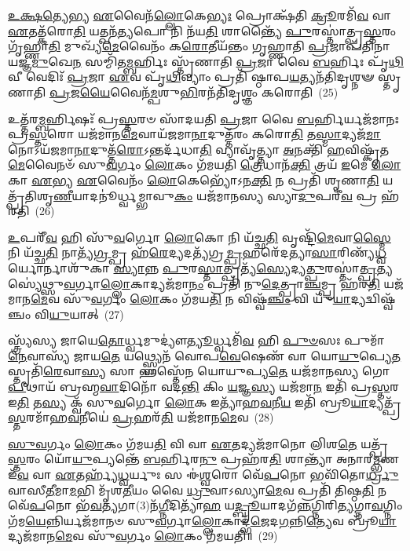 \-\ul{𑌉}\-\-\ul{𑌕𑍍𑌷}\-\-\ul{𑌤𑍍𑌯𑍇}\-𑌭𑍍𑌯 \ul{𑌏}\-𑌵𑍈𑌨᳴\-\ul{𑌲𑍍𑌲𑍋}\-𑌕𑍇\-\ul{𑌭𑍍𑌯𑌃} 𑌪𑍍𑌰𑍋𑌕𑍍𑌷᳴𑌤𑌿 \ul{𑌕𑍍𑌰𑍂}\-𑌰𑌮𑌿᳴\-\ul{𑌵} 𑌵𑌾 \ul{𑌏}\-𑌤𑌤𑍍𑌕᳴𑌰𑍋\-\ul{𑌤𑌿} 𑌯𑌤𑍍𑌖𑌨᳴\-\ul{𑌤𑍍𑌯}\-𑌪𑍋 𑌨𑌿 𑌨᳴𑌯\-\ul{𑌤𑌿} 𑌶𑌾𑌨𑍍𑌤𑍍𑌯𑍈᳴ \ul{𑌪𑍁}\-𑌰𑌸𑍍𑌤𑌾॑𑌤𑍍𑌪𑍍𑌰\-\ul{𑌸𑍍𑌤}\-𑌰𑌂 𑌗𑍃᳴𑌹𑍍𑌣𑌾\-\ul{𑌤𑌿} 𑌮𑍁𑌖𑍍𑌯᳴\-\ul{𑌮𑍇}\-𑌵𑍈𑌨𑌂᳴ 𑌕\-\ul{𑌰𑍋}\-𑌤𑍀𑌯᳴𑌨𑍍𑌤𑌂 𑌗𑍃𑌹𑍍𑌣𑌾𑌤𑌿 \ul{𑌪𑍍𑌰}\-𑌜𑌾𑌪᳴𑌤𑌿𑌨𑌾 𑌯𑌜𑍍𑌞\-\ul{𑌮𑍁}\-𑌖𑍇\-\ul{𑌨} 𑌸𑌮𑍍𑌮𑌿᳴𑌤\-\ul{𑌮𑍍𑌬}\-𑌰𑍍\mbox{}𑌹𑌿𑌃 𑌸𑍍𑌤𑍃᳴𑌣𑌾𑌤𑌿 \ul{𑌪𑍍𑌰}\-𑌜𑌾 𑌵𑍈 \ul{𑌬}\-𑌰𑍍\mbox{}𑌹𑌿𑌃 𑌪𑍃᳴\-\ul{𑌥𑌿}\-𑌵𑍀 𑌵𑍇𑌦𑌿𑌃᳴ \ul{𑌪𑍍𑌰}\-𑌜𑌾 \ul{𑌏}\-𑌵 𑌪𑍃᳴\-\ul{𑌥𑌿}\-𑌵𑍍𑌯𑌾𑌂 𑌪𑍍𑌰𑌤𑌿᳴ 𑌷𑍍𑌠𑌾𑌪\-\ul{𑌯}\-𑌤𑍍𑌯𑌨᳴𑌤𑌿𑌦𑍃𑌶𑍍𑌨𑍟 𑌸𑍍𑌤𑍃𑌣𑌾𑌤𑌿 \ul{𑌪𑍍𑌰}\-𑌜\-\ul{𑌯𑍈}\-𑌵𑍈𑌨᳴\-\ul{𑌮𑍍𑌪}\-𑌶𑍁\-\ul{𑌭𑌿}\-𑌰𑌨᳴𑌤𑌿𑌦𑍃𑌶𑍍𑌞𑌂 𑌕𑌰𑍋𑌤𑌿~(25)

𑌉𑌤𑍍𑌤᳴𑌰\-\ul{𑌮𑍍𑌬}\-𑌰𑍍\mbox{}𑌹𑌿𑌷𑌃᳴ 𑌪𑍍𑌰\-\ul{𑌸𑍍𑌤}\-𑌰𑍞 𑌸𑌾᳴𑌦𑌯𑌤𑌿 \ul{𑌪𑍍𑌰}\-𑌜𑌾 𑌵𑍈 \ul{𑌬}\-𑌰𑍍\mbox{}𑌹𑌿𑌰𑍍𑌯𑌜᳴𑌮𑌾𑌨𑌃 𑌪𑍍𑌰\-\ul{𑌸𑍍𑌤}\-𑌰𑍋 𑌯𑌜᳴𑌮𑌾𑌨\-\ul{𑌮𑍇}\-𑌵𑌾𑌯᳴𑌜𑌮𑌾\-\ul{𑌨𑌾}\-𑌦𑍁𑌤𑍍𑌤᳴𑌰𑌂 𑌕𑌰𑍋\-\ul{𑌤𑌿} 𑌤\-\ul{𑌸𑍍𑌮𑌾}\-𑌦𑍍𑌯𑌜᳴\-\ul{𑌮𑌾}\-𑌨𑍋\-𑌽𑌯᳴𑌜𑌮𑌾\-\ul{𑌨𑌾}\-𑌦𑍁𑌤𑍍𑌤᳴\-\ul{𑌰𑍋}\-\-𑌽𑌨𑍍𑌤𑌰𑍍𑌦᳴𑌧𑌾\-\ul{𑌤𑌿} 𑌵𑍍𑌯𑌾𑌵𑍃᳴𑌤𑍍𑌤𑍍𑌯𑌾 \ul{𑌅}\-𑌨𑌕𑍍𑌤𑌿᳴ \ul{𑌹}\-𑌵𑌿𑌷𑍍𑌕𑍃᳴𑌤\-\ul{𑌮𑍇}\-𑌵𑍈𑌨𑍞᳴ 𑌸𑍁\-\ul{𑌵}\-𑌰𑍍𑌗𑌂 \ul{𑌲𑍋}\-𑌕𑌂 𑌗᳴𑌮𑌯𑌤𑌿 \ul{𑌤𑍍𑌰𑍇}\-𑌧𑌾𑌨᳴\-\ul{𑌕𑍍𑌤𑌿} 𑌤𑍍𑌰𑌯᳴ \ul{𑌇}\-𑌮𑍇 \ul{𑌲𑍋}\-𑌕𑌾 \ul{𑌏}\-𑌭𑍍𑌯 \ul{𑌏}\-𑌵𑍈𑌨𑌂᳴ \ul{𑌲𑍋}\-𑌕𑍇𑌭𑍍𑌯𑍋᳴\-𑌽𑌨\-\ul{𑌕𑍍𑌤𑌿} 𑌨 𑌪𑍍𑌰𑌤𑌿᳴ 𑌶𑍃𑌣𑌾\-\ul{𑌤𑌿} 𑌯𑌤𑍍𑌪𑍍𑌰᳴𑌤𑌿𑌶𑍃\-\ul{𑌣𑍀}\-𑌯𑌾𑌦𑌨𑍂॑𑌰𑍍𑌧𑍍𑌵𑌮𑍍𑌭𑌾𑌵𑍁\-\ul{𑌕𑌂} 𑌯𑌜᳴𑌮𑌾𑌨𑌸𑍍𑌯 𑌸𑍍𑌯𑌾\-\ul{𑌦𑍁}\-𑌪𑌰𑍀᳴\-\ul{𑌵} 𑌪𑍍𑌰 𑌹᳴𑌰𑌤𑌿~(26)

\-\ul{𑌉}\-𑌪𑌰𑍀᳴\-\ul{𑌵} 𑌹𑌿 𑌸𑍁᳴\-\ul{𑌵}\-𑌰𑍍𑌗𑍋 \ul{𑌲𑍋}\-𑌕𑍋 𑌨𑌿 𑌯᳴𑌚𑍍𑌛\-\ul{𑌤𑌿} 𑌵𑍃𑌷𑍍𑌟𑌿᳴\-\ul{𑌮𑍇}\-𑌵𑌾\-\ul{𑌸𑍍𑌮𑍈} 𑌨𑌿 𑌯᳴𑌚𑍍𑌛\-\ul{𑌤𑌿} 𑌨𑌾𑌤𑍍𑌯᳴\-\ul{𑌗𑍍𑌰}\-𑌮𑍍𑌪𑍍𑌰 𑌹᳴\-\ul{𑌰𑍇}\-𑌦𑍍𑌯𑌦𑌤𑍍𑌯᳴𑌗𑍍𑌰\-\ul{𑌮𑍍𑌪𑍍𑌰}\-𑌹𑌰𑍇᳴𑌦𑌤𑍍𑌯𑌾\-\ul{𑌸𑌾}\-𑌰𑌿𑌣𑍍𑌯᳴\-\ul{𑌧𑍍𑌵}\-𑌰𑍍𑌯𑍋\-𑌰𑍍𑌨𑌾𑌶𑍁᳴𑌕𑌾 \ul{𑌸𑍍𑌯𑌾}\-𑌨𑍍𑌨 \ul{𑌪𑍁}\-𑌰\-\ul{𑌸𑍍𑌤𑌾}\-𑌤𑍍𑌪𑍍𑌰𑌤𑍍𑌯᳴\-\ul{𑌸𑍍𑌯𑍇}\-𑌦𑍍𑌯\-\ul{𑌤𑍍𑌪𑍁}\-𑌰𑌸𑍍𑌤𑌾॑\-\ul{𑌤𑍍𑌪𑍍𑌰}\-𑌤𑍍𑌯𑌸𑍍𑌯𑍇॑𑌥𑍍𑌸𑍁\-\ul{𑌵}\-𑌰𑍍𑌗𑌾\-\ul{𑌲𑍍𑌲𑍋}\-𑌕𑌾𑌦𑍍𑌯𑌜᳴𑌮𑌾\-\ul{𑌨𑌂} 𑌪𑍍𑌰𑌤𑌿᳴ 𑌨𑍁\-\ul{𑌦𑍇}\-𑌤𑍍𑌪𑍍𑌰𑌾\-\ul{𑌞𑍍𑌚}\-𑌮𑍍𑌪𑍍𑌰 𑌹᳴𑌰\-\ul{𑌤𑌿} 𑌯𑌜᳴𑌮𑌾𑌨\-\ul{𑌮𑍇}\-𑌵 𑌸𑍁᳴\-\ul{𑌵}\-𑌰𑍍𑌗𑌂 \ul{𑌲𑍋}\-𑌕𑌂 𑌗᳴𑌮𑌯\-\ul{𑌤𑌿} 𑌨 𑌵𑌿𑌷𑍍𑌵᳴\-\ul{𑌞𑍍𑌚𑌂} 𑌵𑌿 𑌯𑍁᳴\-\ul{𑌯𑌾}\-𑌦𑍍𑌯𑌦𑍍𑌵𑌿𑌷𑍍𑌵᳴𑌞𑍍𑌚𑌂 𑌵𑌿\-\ul{𑌯𑍁}\-𑌯𑌾𑌤𑍍~(27)

𑌸𑍍𑌤𑍍𑌰𑍍𑌯᳴𑌸𑍍𑌯 𑌜𑌾𑌯𑍇\-\ul{𑌤𑍋}\-𑌰𑍍𑌧𑍍𑌵𑌮𑍁𑌦𑍍𑌯𑍗॑\-\ul{𑌤𑍍𑌯𑍂}\-𑌰𑍍𑌧𑍍𑌵𑌮𑌿᳴\-\ul{𑌵} 𑌹𑌿 \ul{𑌪𑍁}\-\-\ul{𑍞}\-𑌸𑌃 𑌪𑍁𑌮𑌾᳴\-\ul{𑌨𑍇}\-𑌵𑌾𑌸𑍍𑌯᳴ 𑌜𑌾𑌯\-\ul{𑌤𑍇} 𑌯𑌥𑍍𑌸𑍍𑌫𑍍𑌯𑍇𑌨᳴ 𑌵𑍋𑌪\-\ul{𑌵𑍇}\-𑌷𑍇𑌣᳴ 𑌵𑌾 𑌯𑍋\-\ul{𑌯𑍁}\-𑌪𑍍𑌯𑍇\-\ul{𑌤} 𑌸𑍍𑌤𑍃𑌤𑌿᳴\-\ul{𑌰𑍇}\-𑌵𑌾\-\ul{𑌸𑍍𑌯} 𑌸𑌾 𑌹𑌸𑍍𑌤𑍇᳴𑌨 𑌯𑍋𑌯𑍁𑌪𑍍𑌯\-\ul{𑌤𑍇} 𑌯𑌜᳴𑌮𑌾𑌨𑌸𑍍𑌯 𑌗𑍋\-\ul{𑌪𑍀}\-𑌥𑌾𑌯᳴ 𑌬𑍍𑌰𑌹𑍍𑌮\-\ul{𑌵𑌾}\-𑌦𑌿𑌨𑍋᳴ 𑌵𑌦\-\ul{𑌨𑍍𑌤𑌿} 𑌕𑌿𑌂 \ul{𑌯}\-𑌜𑍍𑌞\-\ul{𑌸𑍍𑌯} 𑌯𑌜᳴𑌮𑌾\-\ul{𑌨} 𑌇𑌤𑌿᳴ 𑌪𑍍𑌰\-\ul{𑌸𑍍𑌤}\-𑌰 𑌇\-\ul{𑌤𑌿} 𑌤\-\ul{𑌸𑍍𑌯} 𑌕𑍍𑌵᳴ 𑌸𑍁\-\ul{𑌵}\-𑌰𑍍𑌗𑍋 \ul{𑌲𑍋}\-𑌕 𑌇𑌤𑍍𑌯𑌾᳴𑌹\-\ul{𑌵}\-𑌨𑍀\-\ul{𑌯} 𑌇𑌤𑌿᳴ 𑌬𑍍𑌰𑍂\-\ul{𑌯𑌾}\-𑌦𑍍𑌯𑌤𑍍𑌪𑍍𑌰᳴\-\ul{𑌸𑍍𑌤}\-𑌰𑌮𑌾᳴𑌹\-\ul{𑌵}\-𑌨𑍀𑌯𑍇॑ \ul{𑌪𑍍𑌰}\-𑌹𑌰᳴\-\ul{𑌤𑌿} 𑌯𑌜᳴𑌮𑌾𑌨\-\ul{𑌮𑍇}\-𑌵~(28)

\-\ul{𑌸𑍁}\-\-\ul{𑌵}\-𑌰𑍍𑌗𑌂 \ul{𑌲𑍋}\-𑌕𑌂 𑌗᳴𑌮𑌯\-\ul{𑌤𑌿} 𑌵𑌿 𑌵𑌾 \ul{𑌏}\-𑌤𑌦𑍍𑌯𑌜᳴𑌮𑌾𑌨𑍋 𑌲𑌿𑌶\-\ul{𑌤𑍇} 𑌯𑌤𑍍𑌪𑍍𑌰᳴\-\ul{𑌸𑍍𑌤}\-𑌰𑌂 𑌯𑍋᳴\-\ul{𑌯𑍁}\-𑌪𑍍𑌯𑌨𑍍𑌤𑍇᳴ \ul{𑌬}\-𑌰𑍍\mbox{}𑌹𑌿𑌰\-\ul{𑌨𑍁} 𑌪𑍍𑌰𑌹᳴𑌰\-\ul{𑌤𑌿} 𑌶𑌾𑌨𑍍𑌤𑍍𑌯𑌾᳴ 𑌅𑌨𑌾𑌰\-\ul{𑌮𑍍𑌭}\-𑌣 𑌇᳴\-\ul{𑌵} 𑌵𑌾 \ul{𑌏}\-𑌤𑌰𑍍\mbox{}𑌹𑍍𑌯᳴\-\ul{𑌧𑍍𑌵}\-𑌰𑍍𑌯𑍁𑌃 𑌸 𑌈॑\-\ul{𑌶𑍍𑌵}\-𑌰𑍋 𑌵𑍇᳴\-\ul{𑌪}\-𑌨𑍋 𑌭𑌵𑌿᳴𑌤𑍋\-\ul{𑌰𑍍𑌧𑍍𑌰𑍁}\-𑌵𑌾𑌸𑍀\-\ul{𑌤𑍀}\-𑌮𑌾\-\ul{𑌮}\-𑌭𑌿 𑌮𑍃᳴𑌶\-\ul{𑌤𑍀}\-𑌯𑌂 𑌵𑍈 \ul{𑌧𑍍𑌰𑍁}\-𑌵𑌾\-𑌽𑌸𑍍𑌯𑌾\-\ul{𑌮𑍇}\-𑌵 𑌪𑍍𑌰𑌤𑌿᳴ 𑌤𑌿𑌷𑍍𑌠\-\ul{𑌤𑌿} 𑌨 𑌵𑍇᳴\-\ul{𑌪}\-𑌨𑍋 𑌭᳴\-\ul{𑌵}\-𑌤𑍍𑌯𑌗𑌾(3)𑌨᳴\-\ul{𑌗𑍍𑌨𑍀}\-𑌦𑌿𑌤𑍍𑌯𑌾᳴\-\ul{𑌹} 𑌯\-\ul{𑌦𑍍𑌬𑍍𑌰𑍂}\-𑌯𑌾𑌦𑌗᳴\-\ul{𑌨𑍍𑌨}\-𑌗𑍍𑌨𑌿𑌰𑌿\-\ul{𑌤𑍍𑌯}\-𑌗𑍍𑌨𑌾\-\ul{𑌵}\-𑌗𑍍𑌨𑌿𑌂 𑌗᳴𑌮\-\ul{𑌯𑍇}\-𑌨𑍍𑌨𑌿𑌰𑍍𑌯𑌜᳴𑌮𑌾𑌨𑍞 𑌸𑍁\-\ul{𑌵}\-𑌰𑍍𑌗𑌾\-\ul{𑌲𑍍𑌲𑍋}\-𑌕𑌾𑌦𑍍𑌭᳴\-\ul{𑌜𑍇}\-𑌦\-\ul{𑌗}\-𑌨𑍍𑌨𑌿\-\ul{𑌤𑍍𑌯𑍇}\-𑌵 𑌬𑍍𑌰𑍂᳴\-\ul{𑌯𑌾}\-𑌦𑍍𑌯𑌜᳴𑌮𑌾𑌨\-\ul{𑌮𑍇}\-𑌵 𑌸𑍁᳴\-\ul{𑌵}\-𑌰𑍍𑌗𑌂 \ul{𑌲𑍋}\-𑌕𑌂 𑌗᳴𑌮𑌯𑌤𑌿॥~(29)

